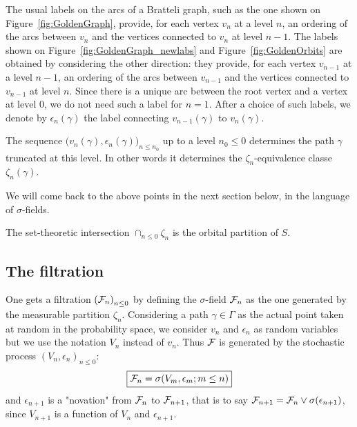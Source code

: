 \documentclass[12pt,a4paper]{article}
\begin{document}
The usual labels on the arcs of a Bratteli graph, such as the one 
shown on Figure~\ref{fig:GoldenGraph}, provide, for each vertex $v_n$ 
at a level $n$, an ordering of the arcs between $v_n$ and the vertices connected 
to $v_n$ at level $n-1$.  
The labels shown on Figure~\ref{fig:GoldenGraph_newlabs} and Figure~\ref{fig:GoldenOrbits} 
are obtained by considering the other direction: they provide, 
for each vertex $v_{n-1}$ at a level $n-1$, 
an ordering of the arcs between $v_{n-1}$ and the vertices connected 
to $v_{n-1}$ at level $n$. 
Since there is a unique arc between the root vertex and a vertex at level $0$, 
we do not need such a label for $n=1$. 
After a choice of such labels, we denote 
by $\epsilon_n(\gamma)$ the label connecting $v_{n-1}(\gamma)$ to 
$v_n(\gamma)$. 
 
The sequence $\bigl(v_n(\gamma), \epsilon_n(\gamma)\bigr)_{n \leq n_0}$ up to 
a level $n_0 \leq 0$ determines the path $\gamma$ truncated at this level. 
In other words it determines the $\zeta_{n}$-equivalence classe 
$\zeta_n(\gamma)$. 

We will come back to the above points in the next section below, in the 
language of $\sigma$-fields. 

\begin{lemma}
The set-theoretic intersection $\cap_{n \leq 0} \zeta_n$ is the orbital partition of $S$. 
\end{lemma}

%

\subsection{The filtration}

One gets a filtration ${(\mathcal{F}_n)}_{n \leq 0}$ by defining the $\sigma$-field 
$\mathcal{F}_n$ as the one generated by the measurable partition $\zeta_n$. 
Considering a path $\gamma \in \Gamma$ as the actual point taken at random 
in the probability space, we consider $v_n$ and $\epsilon_n$ as random 
variables but we use the notation $V_n$ instead of $v_n$. 
Thus $\mathcal{F}$ is generated by the stochastic process 
${(V_n, \epsilon_n)}_{n \leq 0}$:
$$
\boxed{\mathcal{F}_n = \sigma(V_m, \epsilon_m; m \leq n)}
$$
 and $\epsilon_{n+1}$ is a "novation" from $\mathcal{F}_n$ to $\mathcal{F}_{n+1}$, that is 
to say $\mathcal{F}_{n+1} = \mathcal{F}_n \vee \sigma(\epsilon_{n+1})$, since 
$V_{n+1}$ is a function of $V_n$ and $\epsilon_{n+1}$. 
\end{document}
